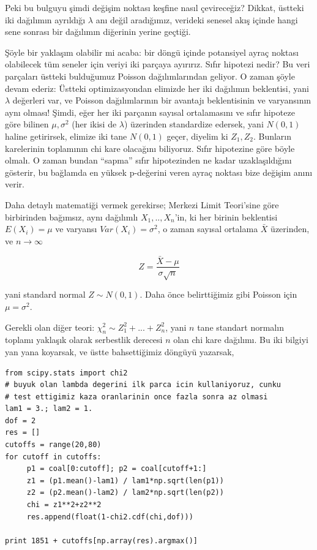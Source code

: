 \documentclass[12pt,fleqn]{article}\usepackage{../../common}
\begin{document}
Peki bu bulguyu şimdi değişim noktası keşfine nasıl çevireceğiz? Dikkat,
üstteki iki dağılımın ayrıldığı $\lambda$ anı değil aradığımız, verideki
senesel akış içinde hangi sene sonrası bir dağılımın diğerinin yerine
geçtiği. 

Şöyle bir yaklaşım olabilir mi acaba: bir döngü içinde potansiyel ayraç
noktası olabilecek tüm seneler için veriyi iki parçaya ayırırız. Sıfır
hipotezi nedir? Bu veri parçaları üstteki bulduğumuz Poisson
dağılımlarından geliyor. O zaman şöyle devam ederiz: Üstteki
optimizasyondan elimizde her iki dağılımın beklentisi, yani $\lambda$
değerleri var, ve Poisson dağılımlarının bir avantajı beklentisinin ve
varyansının aynı olması!  Şimdi, eğer her iki parçanın sayısal ortalamasını
ve sıfır hipoteze göre bilinen $\mu,\sigma^2$ (her ikisi de $\lambda$)
üzerinden standardize edersek, yani $N(0,1)$ haline getirirsek, elimize iki
tane $N(0,1)$ geçer, diyelim ki $Z_1,Z_2$. Bunların karelerinin toplamının
chi kare olacağını biliyoruz. Sıfır hipotezine göre böyle olmalı. O zaman
bundan ``sapma'' sıfır hipotezinden ne kadar uzaklaşıldığını gösterir, bu
bağlamda en yüksek p-değerini veren ayraç noktası bize değişim anını verir.

Daha detaylı matematiği vermek gerekirse; Merkezi Limit Teori'sine göre
birbirinden bağımsız, aynı dağılımlı $X_1,..,X_n$'in, ki her birinin
beklentisi $E(X_i) = \mu$ ve varyansı $Var(X_i)=\sigma^2$, o zaman sayısal
ortalama $\bar{X}$ üzerinden, ve $n \to \infty$

$$ Z = \frac{\bar{X} - \mu }{\sigma \sqrt{n}}   $$

yani standard normal $Z \sim N(0,1)$. Daha önce belirttiğimiz gibi Poisson
için $\mu = \sigma^2$. 

Gerekli olan diğer teori: $\chi_{n}^2 \sim Z_1^2 + ... + Z_n^2$, yani $n$
tane standart normalın toplamı yaklaşık olarak serbestlik derecesi $n$ olan
chi kare dağılımı. Bu iki bilgiyi yan yana koyarsak, ve üstte bahsettiğimiz
döngüyü yazarsak,

\begin{verbatim}
from scipy.stats import chi2
# buyuk olan lambda degerini ilk parca icin kullaniyoruz, cunku
# test ettigimiz kaza oranlarinin once fazla sonra az olmasi
lam1 = 3.; lam2 = 1.
dof = 2
res = []
cutoffs = range(20,80)
for cutoff in cutoffs:
     p1 = coal[0:cutoff]; p2 = coal[cutoff+1:]
     z1 = (p1.mean()-lam1) / lam1*np.sqrt(len(p1))
     z2 = (p2.mean()-lam2) / lam2*np.sqrt(len(p2))
     chi = z1**2+z2**2
     res.append(float(1-chi2.cdf(chi,dof)))

print 1851 + cutoffs[np.array(res).argmax()]
\end{verbatim}
\end{document}
